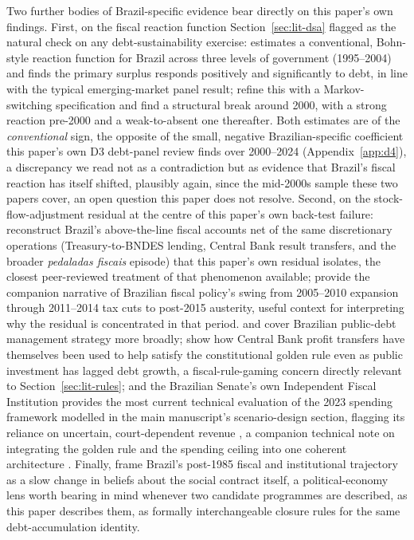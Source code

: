 \documentclass[11pt,a4paper]{article}
\begin{document}
Two further bodies of Brazil-specific evidence bear directly on this paper's own findings. First, on the fiscal reaction function Section~\ref{sec:lit-dsa} flagged as the natural check on any debt-sustainability exercise: \citet{demello2008} estimates a conventional, Bohn-style reaction function for Brazil across three levels of government (1995--2004) and finds the primary surplus responds positively and significantly to debt, in line with the typical emerging-market panel result; \citet{mendoncasantossachsida2009} refine this with a Markov-switching specification and find a structural break around 2000, with a strong reaction pre-2000 and a weak-to-absent one thereafter. Both estimates are of the \emph{conventional} sign, the opposite of the small, negative Brazilian-specific coefficient this paper's own D3 debt-panel review finds over 2000--2024 (Appendix~\ref{app:d4}), a discrepancy we read not as a contradiction but as evidence that Brazil's fiscal reaction has itself shifted, plausibly again, since the mid-2000s sample these two papers cover, an open question this paper does not resolve. Second, on the stock-flow-adjustment residual at the centre of this paper's own back-test failure: \citet{gobettiorair2017} reconstruct Brazil's above-the-line fiscal accounts net of the same discretionary operations (Treasury-to-BNDES lending, Central Bank result transfers, and the broader \emph{pedaladas fiscais} episode) that this paper's own residual isolates, the closest peer-reviewed treatment of that phenomenon available; \citet{orairgobetti2017} provide the companion narrative of Brazilian fiscal policy's swing from 2005--2010 expansion through 2011--2014 tax cuts to post-2015 austerity, useful context for interpreting why the residual is concentrated in that period. \citet{bevilaquagarcia2002} and \citet{vivianmendonca2008} cover Brazilian public-debt management strategy more broadly; \citet{nunesetal2020} show how Central Bank profit transfers have themselves been used to help satisfy the constitutional golden rule even as public investment has lagged debt growth, a fiscal-rule-gaming concern directly relevant to Section~\ref{sec:lit-rules}; and the Brazilian Senate's own Independent Fiscal Institution provides the most current technical evaluation of the 2023 spending framework modelled in the main manuscript's scenario-design section, flagging its reliance on uncertain, court-dependent revenue \citep{ifi2023raf76}, a companion technical note on integrating the golden rule and the spending ceiling into one coherent architecture \citep{enaptesouro2019}. Finally, \citet{alstonmelomuellerpereira2013} frame Brazil's post-1985 fiscal and institutional trajectory as a slow change in beliefs about the social contract itself, a political-economy lens worth bearing in mind whenever two candidate programmes are described, as this paper describes them, as formally interchangeable closure rules for the same debt-accumulation identity.
\end{document}
